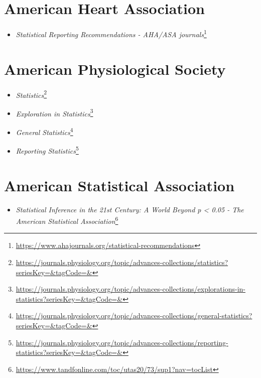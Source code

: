 \documentclass[
  a4paper,
]{book}
\providecommand{\tightlist}{%
  \setlength{\itemsep}{0pt}\setlength{\parskip}{0pt}}
\renewcommand{\href}[2]{#2\footnote{\url{#1}}}
\begin{document}
\hypertarget{american-heart-association}{%
\section*{American Heart Association}\label{american-heart-association}}

\begin{itemize}
\tightlist
\item
  \href{https://www.ahajournals.org/statistical-recommendations}{\emph{Statistical Reporting Recommendations - AHA/ASA journals}}
\end{itemize}

\hypertarget{american-physiological-society}{%
\section*{American Physiological Society}\label{american-physiological-society}}

\begin{itemize}
\item
  \href{https://journals.physiology.org/topic/advances-collections/statistics?seriesKey=\&tagCode=\&}{\emph{Statistics}}
\item
  \href{https://journals.physiology.org/topic/advances-collections/explorations-in-statistics?seriesKey=\&tagCode=\&}{\emph{Exploration in Statistics}}
\item
  \href{https://journals.physiology.org/topic/advances-collections/general-statistics?seriesKey=\&tagCode=\&}{\emph{General Statistics}}
\item
  \href{https://journals.physiology.org/topic/advances-collections/reporting-statistics?seriesKey=\&tagCode=\&}{\emph{Reporting Statistics}}
\end{itemize}

\hypertarget{american-statistical-association}{%
\section*{American Statistical Association}\label{american-statistical-association}}

\begin{itemize}
\tightlist
\item
  \href{https://www.tandfonline.com/toc/utas20/73/sup1?nav=tocList}{\emph{Statistical Inference in the 21st Century: A World Beyond p \textless{} 0.05 - The American Statistical Association}}
\end{itemize}
\end{document}
